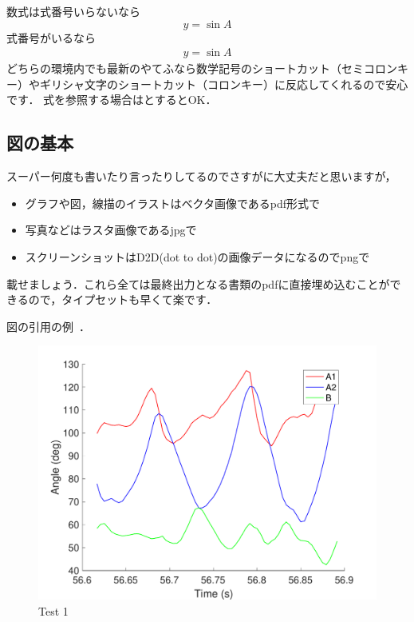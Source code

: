 \documentclass[a4j]{jsarticle}
\begin{document}
数式は式番号いらないなら
\[
 y=\sin{A}
\] 
式番号がいるなら
\begin{align}
 y=\sin{A}
 \label{eq:test}
\end{align}
どちらの環境内でも最新のやてふなら数学記号のショートカット（セミコロンキー）やギリシャ文字のショートカット（コロンキー）に反応してくれるので安心です．
式を参照する場合はとするとOK．

\subsection{図の基本}

スーパー何度も書いたり言ったりしてるのでさすがに大丈夫だと思いますが，
\begin{itemize}
 \item グラフや図，線描のイラストはベクタ画像であるpdf形式で
 \item 写真などはラスタ画像であるjpgで
 \item スクリーンショットはD2D(dot to dot)の画像データになるのでpngで
\end{itemize}
載せましょう．これら全ては最終出力となる書類のpdfに直接埋め込むことができるので，タイプセットも早くて楽です．

図の引用の例~．%


\begin{figure}[tb]
 \centering %
  \includegraphics[width=\columnwidth]{./figure/testfig.pdf}
  \caption{Test 1}
  \label{fig:test}
\end{figure}
\end{document}
